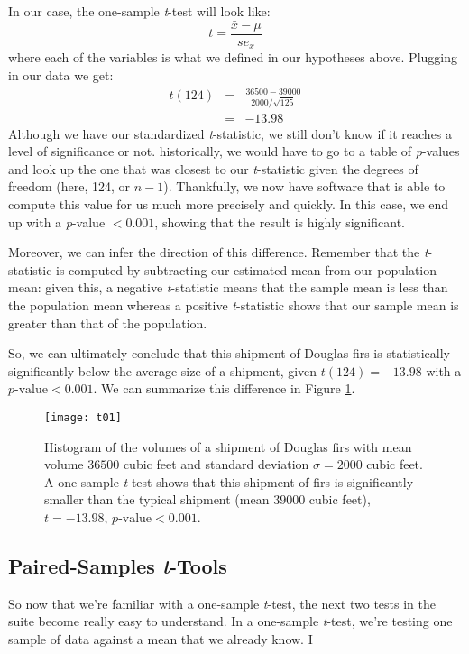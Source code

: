 In our case, the one-sample \textit{t}-test will look like:
\begin{equation}
t=\frac{\bar{x}-\mu}{se_x}
\end{equation}
where each of the variables is what we defined in our hypotheses above. Plugging in our data we get:
\begin{eqnarray*}
t(124)&=&\frac{36500-39000}{2000/\sqrt{125}} \\
&=& -13.98
\end{eqnarray*}
Although we have our standardized \textit{t}-statistic, we still don't know if it reaches a level of significance or not. historically, we would have to go to a table of \textit{p}-values and look up the one that was closest to our \textit{t}-statistic given the degrees of freedom (here, 124, or $n-1$). Thankfully, we now have software that is able to compute this value for us much more precisely and quickly. In this case, we end up with a \textit{p}-value $< 0.001$, showing that the result is highly significant.

Moreover, we can infer the direction of this difference. Remember that the \textit{t}-statistic is computed by subtracting our estimated mean from our population mean: given this, a negative \textit{t}-statistic means that the sample mean is less than the population mean whereas a positive \textit{t}-statistic shows that our sample mean is greater than that of the population.

So, we can ultimately conclude that this shipment of Douglas firs is statistically significantly below the average size of a shipment, given $t(124)=-13.98$ with a $p\text{-value} < 0.001$. We can summarize this difference in Figure \ref{fig:t01}.

\begin{figure}[h]
\texttt{[image: t01]}
\label{fig:t01}
\caption{Histogram of the volumes of a shipment of Douglas firs with mean volume $36500$ cubic feet and standard deviation $\sigma = 2000$ cubic feet. A one-sample \textit{t}-test shows that this shipment of firs is significantly smaller than the typical shipment (mean $39000$ cubic feet), $t=-13.98$, $p\text{-value}<0.001$.}
\end{figure}

\subsection{Paired-Samples \textit{t}-Tools}

So now that we're familiar with a one-sample \textit{t}-test, the next two tests in the suite become really easy to understand. In a one-sample \textit{t}-test, we're testing one sample of data against a mean that we already know. I

